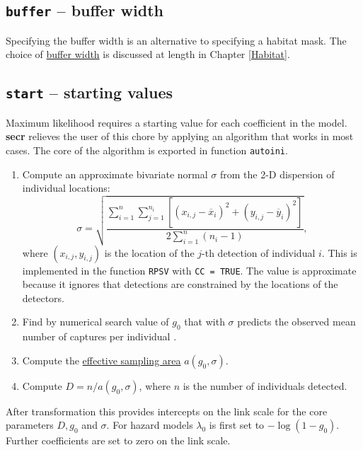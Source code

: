 \documentclass[
]{book}
\providecommand{\tightlist}{%
  \setlength{\itemsep}{0pt}\setlength{\parskip}{0pt}}
\begin{document}
\subsection{\texorpdfstring{\texttt{buffer} -- buffer width}{buffer -- buffer width}}\label{buffer-buffer-width}

Specifying the buffer width is an alternative to specifying a habitat mask. The choice of \hyperref[bufferwidth]{buffer width} is discussed at length in Chapter \ref{Habitat}.

\subsection{\texorpdfstring{\texttt{start} -- starting values}{start -- starting values}}\label{start-starting-values}

Maximum likelihood requires a starting value for each coefficient in the model. \textbf{secr} relieves the user of this chore by applying an algorithm that works in most cases. The core of the algorithm is exported in function \texttt{autoini}.

\begin{enumerate}
\def\labelenumi{\arabic{enumi}.}
\tightlist
\item
  Compute an approximate bivariate normal \(\sigma\) from the 2-D dispersion of individual locations:
  \begin{equation}
  \sigma = \sqrt{\frac {\sum\limits _{i=1}^{n} \sum\limits _{j=1}^{n_i} [
       (x_{i,j} - \overline x_i)^2 + (y_{i,j} - \overline y_i)^2]}
       {2\sum\limits _{i=1}^{n} (n_i-1)}},
  \end{equation}
  where \((x_{i,j}, y_{i,j})\) is the location of the \(j\)-th detection of individual \(i\). This is implemented in the function \texttt{RPSV} with \texttt{CC\ =\ TRUE}. The value is approximate because it ignores that detections are constrained by the locations of the detectors.
\item
  Find by numerical search value of \(g_0\) that with \(\sigma\) predicts the observed mean number of captures per individual \citep[Appendix B]{edb09}.
\item
  Compute the \hyperref[esa]{effective sampling area} \(a(g_0, \sigma)\).
\item
  Compute \(D = n/a(g_0, \sigma)\), where \(n\) is the number of individuals detected.
\end{enumerate}

After transformation this provides intercepts on the link scale for the core parameters \(D, g_0\) and \(\sigma\). For hazard models \(\lambda_0\) is first set to \(-\log(1 - g_0)\). Further coefficients are set to zero on the link scale.
\end{document}
